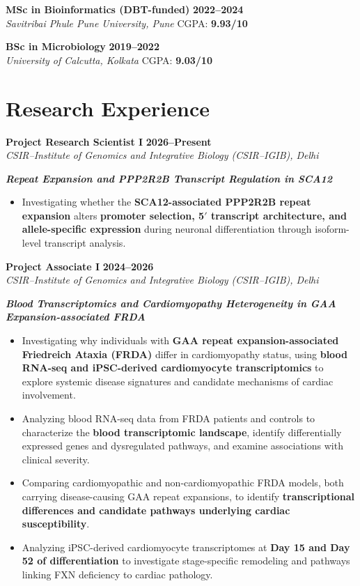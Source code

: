 \documentclass[10pt,a4paper]{article}
\newcommand{\entry}[4]{
    \noindent\textbf{#1} \hfill \textbf{#2}\\
    \textit{#3} \hfill #4\vspace{0.3em}\par
}
\newcommand{\project}[1]{
    \noindent\textbf{\textit{#1}}\vspace{0.1em}\par
}
\begin{document}
\entry
{MSc in Bioinformatics (DBT-funded)}
{2022--2024}
{Savitribai Phule Pune University, Pune}
{CGPA: \textbf{9.93/10}}

\entry
{BSc in Microbiology}
{2019--2022}
{University of Calcutta, Kolkata}
{CGPA: \textbf{9.03/10}}


\section{Research Experience}

\entry
{Project Research Scientist I}
{2026--Present}
{CSIR--Institute of Genomics and Integrative Biology (CSIR--IGIB), Delhi}
{}

\project{Repeat Expansion and PPP2R2B Transcript Regulation in SCA12}
\begin{itemize}
\item Investigating whether the \textbf{SCA12-associated PPP2R2B repeat expansion} alters \textbf{promoter selection, 5$'$ transcript architecture, and allele-specific expression} during neuronal differentiation through isoform-level transcript analysis.
\end{itemize}

\entry
{Project Associate I}
{2024--2026}
{CSIR--Institute of Genomics and Integrative Biology (CSIR--IGIB), Delhi}
{}

\project{Blood Transcriptomics and Cardiomyopathy Heterogeneity in GAA Expansion-associated FRDA}
\begin{itemize}
\item Investigating why individuals with \textbf{GAA repeat expansion-associated Friedreich Ataxia (FRDA)} differ in cardiomyopathy status, using \textbf{blood RNA-seq and iPSC-derived cardiomyocyte transcriptomics} to explore systemic disease signatures and candidate mechanisms of cardiac involvement.
\item Analyzing blood RNA-seq data from FRDA patients and controls to characterize the \textbf{blood transcriptomic landscape}, identify differentially expressed genes and dysregulated pathways, and examine associations with clinical severity.
\item Comparing cardiomyopathic and non-cardiomyopathic FRDA models, both carrying disease-causing GAA repeat expansions, to identify \textbf{transcriptional differences and candidate pathways underlying cardiac susceptibility}.
\item Analyzing iPSC-derived cardiomyocyte transcriptomes at \textbf{Day 15 and Day 52 of differentiation} to investigate stage-specific remodeling and pathways linking FXN deficiency to cardiac pathology.
\end{itemize}
\end{document}
